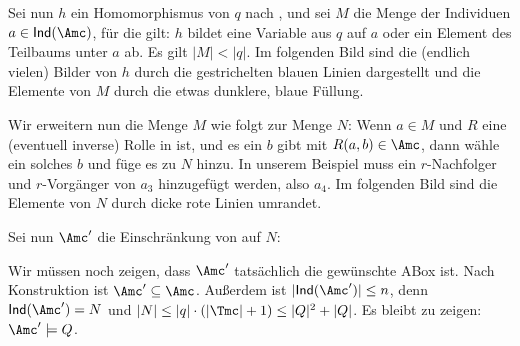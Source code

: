 \documentclass[fontsize=11pt, twoside=false, numbers=autoenddot]{scrbook}
\begin{document}
Sei nun $h$ ein Homomorphismus von $q$ nach \Umc,
und sei $M$ die Menge der Individuen $a \in \textsf{Ind}(\Amc)$,
für die gilt: $h$ bildet eine Variable aus $q$
auf $a$ oder ein Element des Teilbaums unter $a$ ab.
Es gilt $|M| < |q|$.
Im folgenden Bild sind die (endlich vielen) Bilder von $h$
durch die gestrichelten blauen Linien dargestellt
und die Elemente von $M$ durch die etwas dunklere, blaue Füllung.
%
\begin{center}
\end{center}
%
Wir erweitern nun die Menge $M$ wie folgt zur Menge $N$:
Wenn $a \in M$ und $R$ eine (eventuell inverse) Rolle in \Tmc ist,
und es ein $b$ gibt mit $R(a,b) \in \Amc$, dann wähle ein solches $b$
und füge es zu $N$ hinzu.
In unserem Beispiel muss ein $r$-Nachfolger und $r$-Vorgänger von $a_3$
hinzugefügt werden, also $a_4$.
Im folgenden Bild sind die Elemente von $N$ durch 
dicke rote Linien umrandet.
%
\begin{center}
\end{center}
%
Sei nun $\Amc'$ die Einschränkung von \Amc auf $N$:
%
\begin{center}
\end{center}
%
Wir müssen noch zeigen, dass $\Amc'$ tatsächlich die gewünschte ABox ist.
Nach Konstruktion ist $\Amc' \subseteq \Amc$.
Außerdem ist $|\textsf{Ind}(\Amc')| \leq n$,
denn $\textsf{Ind}(\Amc') = N$ und
$|N| \leq |q| \cdot (|\Tmc| + 1) \leq |Q|^2 + |Q|$.
Es bleibt zu zeigen: $\Amc' \models Q$.
\end{document}
